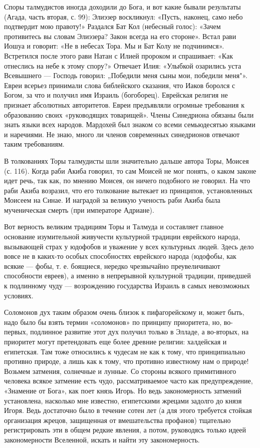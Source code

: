 Споры талмудистов иногда доходили до Бога, и вот какие бывали результаты
(Агада, часть вторая, с. 99): Элиэзер воскликнул: «Пусть, наконец, само небо
подтвердит мою правоту!» Раздался Бат Кол (небесный голос): «Зачем противитесь
вы словам Элиэзера? Закон всегда на его стороне». Встал рави Иошуа и говорит:
«Не в небесах Тора. Мы и Бат Колу не подчинимся». Встретился после этого рави
Натан с Илией пророком и спрашивает: «Как отнеслись на небе к этому спору?»
Отвечает Илия: «Улыбкой озарились уста Всевышнего --- Господь говорил: „Победили
меня сыны мои, победили меня"». Евреи всерьез принимали слова библейского
сказания, что Иаков боролся с Богом, за что и получил имя Израиль (богоборец).
Еврейская религия не признает абсолютных авторитетов. Евреи предъявляли
огромные требования к образованию своих «руководящих товарищей». Члены
Синедриона обязаны были знать языки всех народов. Мардохей был знаком со всеми
семьюдесятью языками и наречиями. Не знаю, много ли членов современных
синедрионов отвечают таким требованиям.

В толкованиях Торы талмудисты шли значительно дальше автора Торы, Моисея (с.
116). Когда раби Акиба говорил, то сам Моисей не мог понять, о каком законе
идет речь, так как, по мнению Моисея, он ничего подобного не говорил. На что
раби Акиба возразил, что его толкование вытекает из принципов, установленных
Моисеем на Синае. И наградой за великую ученость раби Акиба была мученическая
смерть (при императоре Адриане).

Вот верность великим традициям Торы и Талмуда и составляет главное основание
изумительной живучести культурной традиции еврейского народа, вызывающей страх
у юдофобов и уважение у всех культурных людей. Здесь дело вовсе не в каких-то
особых способностях
еврейского народа (юдофобы, как всякие --- фобы, т. е. боящиеся, нередко
чрезвычайно преувеличивают способности евреев), а именно в непрерывной
культурной традиции, приведшей к подлинному чуду --- возрождению государства
Израиль в самых невозможных условиях.

Соломонов дух таким образом очень близок к пифагорейскому и, может быть, надо
было бы взять термин «соломонов» по принципу приоритета, но, во-первых,
подлинное развитие этот дух получил только в Элладе, а во-вторых, на приоритет
могут претендовать еще более древние религии: халдейская и египетская. Там тоже
относились к чудесам не как к тому, что принципиально противно природе, а лишь
как к тому, что противно известному нам о природе! Возьмем затмения, солнечные
и лунные. Со стороны всякого примитивного человека всякое затмение есть чудо,
рассматриваемое часто как предупреждение, «Знамение от Бога», как поет князь
Игорь. Но ведь закономерность затмений установлена, насколько мне известно,
египетскими жрецами задолго до князя Игоря. Ведь достаточно было в течение
сотен лет (а для этого требуется стойкая организация жрецов, защищенная от
вмешательства профанов) тщательно регистрировать эти в общем редкие явления, а
потом, руководясь только идеей закономерности Вселенной, искать и найти эту
закономерность.

